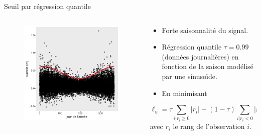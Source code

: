 \documentclass[aspectratio=169]{beamer}
\begin{document}
\begin{frame}{Seuil par régression quantile}
\begin{columns}
	\begin{column}{0.4\textwidth}
		\begin{figure}
		\vspace{-0.4cm}
	 		\includegraphics[height=0.85\textheight, center]{../figures/points.pdf}
		\end{figure}
	\end{column}
	\begin{column}{0.6\textwidth}
	\begin{itemize}
	\setlength{\itemsep}{10pt}
	\item Forte saisonnalité du signal.
	\item Régression quantile $\tau = 0.99$ (données journalières) en fonction de la saison modélisé par une sinusoïde.
	\item En minimisant
	\end{itemize}
	\begin{equation*}
	\ell_u = \tau \sum_{i|r_i \geq 0} |r_i| + (1-\tau) \sum_{i|r_i < 0} |r_i|
	\end{equation*}
	\phantom{-----.} avec $r_i$ le rang de l'observation $i$. %
	\end{column}
\end{columns}
\end{frame}
\end{document}
